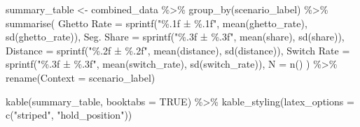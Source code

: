 \documentclass[
  11pt,
]{article}
\newenvironment{Shaded}{\begin{snugshade}}{\end{snugshade}}
\newcommand{\AttributeTok}[1]{\textcolor[rgb]{0.40,0.45,0.13}{#1}}
\newcommand{\ConstantTok}[1]{\textcolor[rgb]{0.56,0.35,0.01}{#1}}
\newcommand{\FunctionTok}[1]{\textcolor[rgb]{0.28,0.35,0.67}{#1}}
\newcommand{\NormalTok}[1]{\textcolor[rgb]{0.00,0.23,0.31}{#1}}
\newcommand{\OtherTok}[1]{\textcolor[rgb]{0.00,0.23,0.31}{#1}}
\newcommand{\SpecialCharTok}[1]{\textcolor[rgb]{0.37,0.37,0.37}{#1}}
\newcommand{\StringTok}[1]{\textcolor[rgb]{0.13,0.47,0.30}{#1}}
\begin{document}
\begin{Shaded}
\begin{Highlighting}[]
\NormalTok{summary\_table }\OtherTok{\textless{}{-}}\NormalTok{ combined\_data }\SpecialCharTok{\%\textgreater{}\%}
  \FunctionTok{group\_by}\NormalTok{(scenario\_label) }\SpecialCharTok{\%\textgreater{}\%}
  \FunctionTok{summarise}\NormalTok{(}
    \StringTok{\textasciigrave{}}\AttributeTok{Ghetto Rate}\StringTok{\textasciigrave{}} \OtherTok{=} \FunctionTok{sprintf}\NormalTok{(}\StringTok{"\%.1f ± \%.1f"}\NormalTok{, }\FunctionTok{mean}\NormalTok{(ghetto\_rate), }\FunctionTok{sd}\NormalTok{(ghetto\_rate)),}
    \StringTok{\textasciigrave{}}\AttributeTok{Seg. Share}\StringTok{\textasciigrave{}} \OtherTok{=} \FunctionTok{sprintf}\NormalTok{(}\StringTok{"\%.3f ± \%.3f"}\NormalTok{, }\FunctionTok{mean}\NormalTok{(share), }\FunctionTok{sd}\NormalTok{(share)),}
    \StringTok{\textasciigrave{}}\AttributeTok{Distance}\StringTok{\textasciigrave{}} \OtherTok{=} \FunctionTok{sprintf}\NormalTok{(}\StringTok{"\%.2f ± \%.2f"}\NormalTok{, }\FunctionTok{mean}\NormalTok{(distance), }\FunctionTok{sd}\NormalTok{(distance)),}
    \StringTok{\textasciigrave{}}\AttributeTok{Switch Rate}\StringTok{\textasciigrave{}} \OtherTok{=} \FunctionTok{sprintf}\NormalTok{(}\StringTok{"\%.3f ± \%.3f"}\NormalTok{, }\FunctionTok{mean}\NormalTok{(switch\_rate), }\FunctionTok{sd}\NormalTok{(switch\_rate)),}
    \AttributeTok{N =} \FunctionTok{n}\NormalTok{()}
\NormalTok{  ) }\SpecialCharTok{\%\textgreater{}\%}
  \FunctionTok{rename}\NormalTok{(}\AttributeTok{Context =}\NormalTok{ scenario\_label)}

\FunctionTok{kable}\NormalTok{(summary\_table, }\AttributeTok{booktabs =} \ConstantTok{TRUE}\NormalTok{) }\SpecialCharTok{\%\textgreater{}\%}
  \FunctionTok{kable\_styling}\NormalTok{(}\AttributeTok{latex\_options =} \FunctionTok{c}\NormalTok{(}\StringTok{"striped"}\NormalTok{, }\StringTok{"hold\_position"}\NormalTok{))}
\end{Highlighting}
\end{Shaded}
\end{document}
